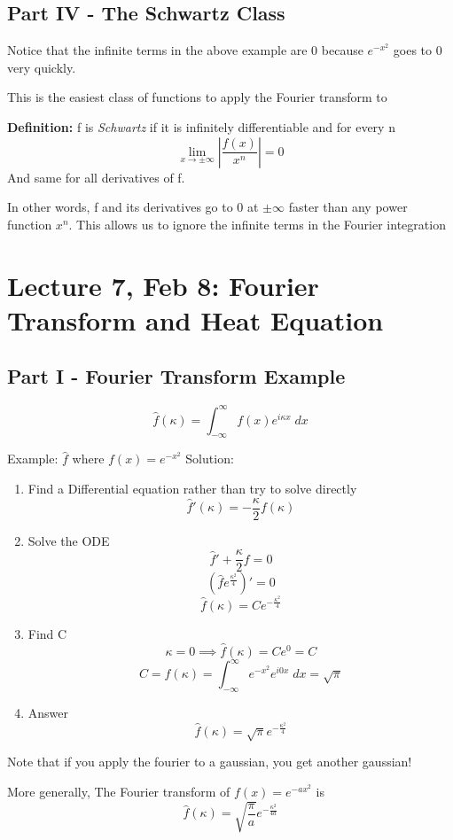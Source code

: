 \documentclass[12pt]{article}
\newcommand{\ans}[1]{\boxed{\text{#1}}}
\renewcommand{\hat}[1]{\widehat{#1}}
\begin{document}
\subsection*{Part IV - The Schwartz Class}
Notice that the infinite terms in the above example are 0 because $e^{-x^2}$ goes to 0 very quickly. 

This is the easiest class of functions to apply the Fourier transform to 

\textbf{Definition:} f is \emph{Schwartz} if it is infinitely differentiable and for every n 
\[\lim_{x\to \pm \infty} \left|\frac{f(x)}{x^n}\right| = 0\]
And same for all derivatives of f.

In other words, f and its derivatives go to 0 at $\pm \infty$ faster than any power function $x^n$. This allows us to ignore the infinite terms in the Fourier integration

\section*{Lecture 7, Feb 8: Fourier Transform and Heat Equation}
\subsection*{Part I - Fourier Transform Example}
\[\hat{f}(\kappa) = \int_{-\infty}^\infty f(x) e^{i \kappa x}\; dx \]

Example: $\hat{f}$ where $f(x) = e^{-x^2}$
Solution: 
\begin{enumerate}
    \item Find a Differential equation rather than try to solve directly
    \[\hat{f}'(\kappa) = -\frac{\kappa}{2} f(\kappa)\]
    \item Solve the ODE 
    \[\hat{f}' + \frac{\kappa}{2}f = 0\]
    \[\left(\hat{f}e^{\frac{\kappa^2}{4}}\right)' = 0\]
    \[\hat{f}(\kappa) = Ce^{-\frac{\kappa^2}{4}}\]
    \item Find C
    \[\kappa = 0 \implies \hat{f}(\kappa) = Ce^0 = C\]
    \[C = \hat{f}(\kappa) = \int_{-\infty}^{\infty}e^{-x^2}e^{i0x} \; dx = \sqrt{\pi} \]
    \item Answer 
    \[\ans{$\hat{f}(\kappa) = \sqrt{\pi} e^{-\frac{\kappa^2}{4}}$}\]
\end{enumerate} 

Note that if you apply the fourier to a gaussian, you get another gaussian! 

More generally, 
The Fourier transform of $f(x) = e^{-ax^2}$ is
\[\ans{$\hat{f}(\kappa) = \sqrt{\frac{\pi}{a}}e^{-\frac{\kappa^2}{4a}}$}\]
\end{document}

